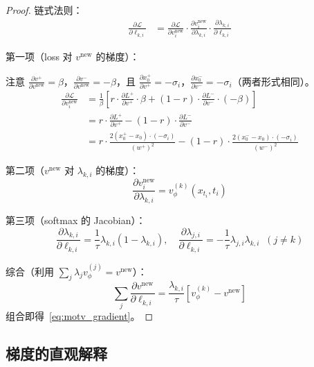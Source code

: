 \documentclass[11pt,a4paper]{article}
\newcommand{\loss}{\mathcal{L}}
\newcommand{\vphi}{v_\phi}
\theoremstyle{definition}
\begin{document}
\begin{proof}
链式法则：
\begin{align}
\frac{\partial \loss}{\partial \ell_{k,i}}
&= \frac{\partial \loss}{\partial v^{\mathrm{new}}_i} \cdot \frac{\partial v^{\mathrm{new}}_i}{\partial \lambda_{k,i}} \cdot \frac{\partial \lambda_{k,i}}{\partial \ell_{k,i}}
\end{align}

第一项（loss 对 $v^{\mathrm{new}}$ 的梯度）：

注意 $\frac{\partial v^+}{\partial v^{\mathrm{new}}} = \beta$，$\frac{\partial v^-}{\partial v^{\mathrm{new}}} = -\beta$，且 $\frac{\partial x_0^+}{\partial v^+} = -\sigma_i$，$\frac{\partial x_0^-}{\partial v^-} = -\sigma_i$（两者形式相同）。
\begin{align}
\frac{\partial \loss}{\partial v^{\mathrm{new}}_i} &= \frac{1}{\beta}\left[r \cdot \frac{\partial L^+}{\partial v^+}\cdot \beta + (1-r)\cdot \frac{\partial L^-}{\partial v^-}\cdot (-\beta)\right] \\
&= r \cdot \frac{\partial L^+}{\partial v^+} - (1-r)\cdot \frac{\partial L^-}{\partial v^-} \\
&= r \cdot \frac{2(x_0^+ - x_0) \cdot (-\sigma_i)}{(w^+)^2} - (1-r)\cdot \frac{2(x_0^- - x_0)\cdot(-\sigma_i)}{(w^-)^2}
\end{align}

第二项（$v^{\mathrm{new}}$ 对 $\lambda_{k,i}$ 的梯度）：
\begin{equation}
\frac{\partial v^{\mathrm{new}}_i}{\partial \lambda_{k,i}} = \vphi^{(k)}(x_{t_i}, t_i)
\end{equation}

第三项（softmax 的 Jacobian）：
\begin{equation}
\frac{\partial \lambda_{k,i}}{\partial \ell_{k,i}} = \frac{1}{\tau}\lambda_{k,i}(1 - \lambda_{k,i}), \quad
\frac{\partial \lambda_{j,i}}{\partial \ell_{k,i}} = -\frac{1}{\tau}\lambda_{j,i}\lambda_{k,i} \;\;(j \neq k)
\end{equation}

综合（利用 $\sum_j \lambda_j \vphi^{(j)} = v^{\mathrm{new}}$）：
\begin{equation}
\sum_j \frac{\partial v^{\mathrm{new}}}{\partial \ell_{k,i}} = \frac{\lambda_{k,i}}{\tau}\left[\vphi^{(k)} - v^{\mathrm{new}}\right]
\end{equation}
组合即得~\eqref{eq:motv_gradient}。
\end{proof}

\subsection{梯度的直观解释}
\end{document}
